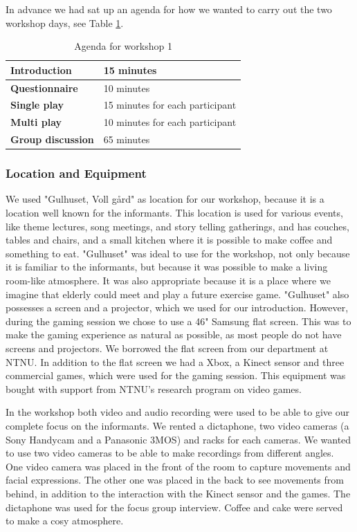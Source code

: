 In advance we had sat up an agenda for how we wanted to carry out the two workshop days,  see Table \ref{tab:agendaW1}.  

\begin{table} [H]
\centering
    \begin{tabular}{|l|l|}
       \hline
       \textbf{Introduction} & 15 minutes  \\ \hline
       \textbf{Questionnaire} & 10 minutes  \\ \hline
       \textbf{Single play} & 15 minutes for each participant \\ \hline
       \textbf{Multi play} & 10 minutes for each participant \\ \hline
	   \textbf{Group discussion} & 65 minutes \\ \hline
    \end{tabular}
    \caption[Workshop 1 agenda]{Agenda for workshop 1}
    \label{tab:agendaW1}
\end{table}  

\subsubsection{Location and Equipment}
We used "Gulhuset, Voll gård" as location for our workshop, because it is a location well known for the informants. This location is used for various events, like theme lectures, song meetings, and story telling gatherings, and has couches, tables and chairs, and a small kitchen where it is possible to make coffee and something to eat. "Gulhuset" was ideal to use for the workshop, not only because it is familiar to the informants, but because it was possible to make a living room-like atmosphere. It was also appropriate because it is a place where we imagine that elderly could meet and play a future exercise game. "Gulhuset" also possesses a screen and a projector, which we used for our introduction. However, during the gaming session we chose to use a 46" Samsung flat screen. This was to make the gaming experience as natural as possible, as most people do not have screens and projectors. We borrowed the flat screen from our department at NTNU. In addition to the flat screen we had a Xbox, a Kinect sensor and three commercial games, which were used for the gaming session. This equipment was bought with support from NTNU's research program on video games.   

In the workshop both video and audio recording were used to be able to give our complete focus on the informants. We rented a dictaphone, two video cameras (a Sony Handycam and a Panasonic 3MOS) and racks for each cameras. We wanted to use two video cameras to be able to make recordings from different angles. One video camera was placed in the front of the room to capture movements and facial expressions. The other one was placed in the back to see movements from behind, in addition to the interaction with the Kinect sensor and the games. The dictaphone was used for the focus group interview. Coffee and cake were served to make a cosy atmosphere. 

